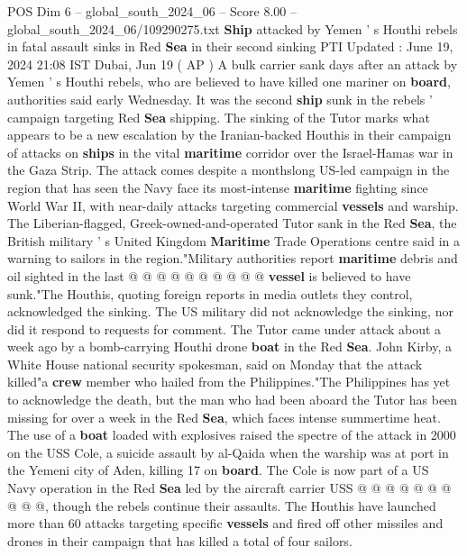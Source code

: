 \begin{textsample}{POS Dim 6 – global\_south\_2024\_06 – Score 8.00 – global\_south\_2024\_06/109290275.txt}  \label{ex:f6_pos_153}
\textbf{Ship} attacked by Yemen ' s Houthi rebels in fatal assault sinks in Red \textbf{Sea} in their second sinking PTI Updated : June 19, 2024 21:08 IST Dubai, Jun 19 ( AP ) A bulk carrier sank days after an attack by Yemen ' s Houthi rebels, who are believed to have killed one mariner on \textbf{board}, authorities said early Wednesday.
It was the second \textbf{ship} sunk in the rebels ' campaign targeting Red \textbf{Sea} shipping.
The sinking of the Tutor marks what appears to be a new escalation by the Iranian-backed Houthis in their campaign of attacks on \textbf{ships} in the vital \textbf{maritime} corridor over the Israel-Hamas war in the Gaza Strip.
The attack comes despite a monthslong US-led campaign in the region that has seen the Navy face its most-intense \textbf{maritime} fighting since World War II, with near-daily attacks targeting commercial \textbf{vessels} and warship.
The Liberian-flagged, Greek-owned-and-operated Tutor sank in the Red \textbf{Sea}, the British military ' s United Kingdom \textbf{Maritime} Trade Operations centre said in a warning to sailors in the region."Military authorities report \textbf{maritime} debris and oil sighted in the last @ @ @ @ @ @ @ @ @ @ \textbf{vessel} is believed to have sunk."The Houthis, quoting foreign reports in media outlets they control, acknowledged the sinking.
The US military did not acknowledge the sinking, nor did it respond to requests for comment.
The Tutor came under attack about a week ago by a bomb-carrying Houthi drone \textbf{boat} in the Red \textbf{Sea}.
John Kirby, a White House national security spokesman, said on Monday that the attack killed"a \textbf{crew} member who hailed from the Philippines."The Philippines has yet to acknowledge the death, but the man who had been aboard the Tutor has been missing for over a week in the Red \textbf{Sea}, which faces intense summertime heat.
The use of a \textbf{boat} loaded with explosives raised the spectre of the attack in 2000 on the USS Cole, a suicide assault by al-Qaida when the warship was at port in the Yemeni city of Aden, killing 17 on \textbf{board}.
The Cole is now part of a US Navy operation in the Red \textbf{Sea} led by the aircraft carrier USS @ @ @ @ @ @ @ @ @ @, though the rebels continue their assaults.
The Houthis have launched more than 60 attacks targeting specific \textbf{vessels} and fired off other missiles and drones in their campaign that has killed a total of four sailors.

\end{textsample}
